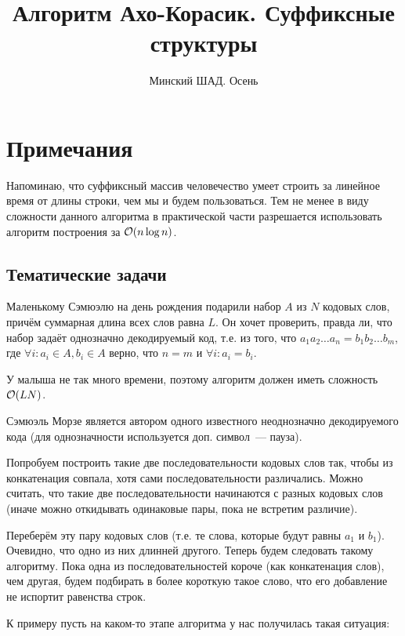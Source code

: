 \documentclass[addpoints]{exam}
\title{Алгоритм Ахо-Корасик. Суффиксные структуры}
\author{Минский ШАД. Осень}
\begin{document}
\maketitle

\section{Примечания}

Напоминаю, что суффиксный массив человечество умеет строить за линейное время от длины строки, чем мы и будем пользоваться. Тем не менее в виду сложности данного алгоритма в практической части разрешается использовать алгоритм построения за $\mathcal{O}(n \log{n})$. 

\begin{questions}

\section{Тематические задачи}

\question[1 \half] Маленькому Сэмюэлю на день рождения подарили набор $A$ из $N$ кодовых слов, причём суммарная длина всех слов равна $L$. Он хочет проверить, правда ли, что набор задаёт однозначно декодируемый код, т.е. из того, что $a_1 a_2 \ldots a_n = b_1 b_2 \ldots b_m$, где $\forall i: a_i \in A, b_i \in A$ верно, что $n=m$ и $\forall i: a_i = b_i$.

У малыша не так много времени, поэтому алгоритм должен иметь сложность $\mathcal{O}(LN)$.

\begin{solution}

Сэмюэль Морзе является автором одного известного неоднозначно декодируемого кода (для однозначности используется доп. символ~--- пауза).

Попробуем построить такие две последовательности кодовых слов так, чтобы из конкатенация совпала, хотя сами последовательности различались. Можно считать, что такие две последовательности начинаются с разных кодовых слов (иначе можно откидывать одинаковые пары, пока не встретим различие).

Переберём эту пару кодовых слов (т.е. те слова, которые будут равны $a_1$ и $b_1$). Очевидно, что одно из них длинней другого. Теперь будем следовать такому алгоритму. Пока одна из последовательностей короче (как конкатенация слов), чем другая, будем подбирать в более короткую такое слово, что его добавление не испортит равенства строк.

К примеру пусть на каком-то этапе алгоритма у нас получилась такая ситуация:


\end{solution}
\end{questions}
\end{document}
